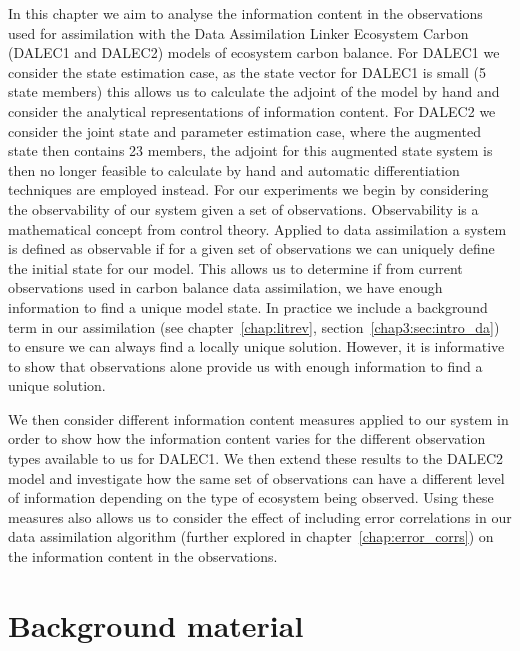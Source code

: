 In this chapter we aim to analyse the information content in the observations used for assimilation with the Data Assimilation Linker Ecosystem Carbon (DALEC1 and DALEC2) models of ecosystem carbon balance. For DALEC1 we consider the state estimation case, as the state vector for DALEC1 is small (5 state members) this allows us to calculate the adjoint of the model by hand and consider the analytical representations of information content. For DALEC2 we consider the joint state and parameter estimation case, where the augmented state then contains 23 members, the adjoint for this augmented state system is then no longer feasible to calculate by hand and automatic differentiation techniques are employed instead. For our experiments we begin by considering the observability of our system given a set of observations. Observability is a mathematical concept from control theory. Applied to data assimilation a system is defined as observable if for a given set of observations we can uniquely define the initial state for our model. This allows us to determine if from current observations used in carbon balance data assimilation, we have enough information to find a unique model state. In practice we include a background term in our assimilation (see chapter~\ref{chap:litrev}, section~\ref{chap3:sec:intro_da}) to ensure we can always find a locally unique solution. However, it is informative to show that observations alone provide us with enough information to find a unique solution.

We then consider different information content measures applied to our system in order to show how the information content varies for the different observation types available to us for DALEC1. We then extend these results to the DALEC2 model and investigate how the same set of observations can have a different level of information depending on the type of ecosystem being observed. Using these measures also allows us to consider the effect of including error correlations in our data assimilation algorithm (further explored in chapter~\ref{chap:error_corrs}) on the information content in the observations.

\section{Background material}

